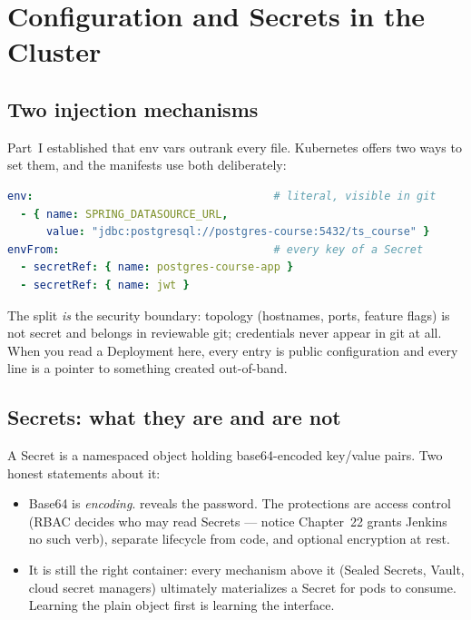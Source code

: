 \chapter{Configuration and Secrets in the Cluster}
\label{ch:secrets}

\section{Two injection mechanisms}

Part~I established that env vars outrank every file. Kubernetes offers
two ways to set them, and the manifests use both deliberately:

\begin{lstlisting}[language=yaml]
env:                                     # literal, visible in git
  - { name: SPRING_DATASOURCE_URL,
      value: "jdbc:postgresql://postgres-course:5432/ts_course" }
envFrom:                                 # every key of a Secret
  - secretRef: { name: postgres-course-app }
  - secretRef: { name: jwt }
\end{lstlisting}

The split \emph{is} the security boundary: topology (hostnames, ports,
feature flags) is not secret and belongs in reviewable git; credentials
never appear in git at all. When you read a Deployment here, every
 entry is public configuration and every  line
is a pointer to something created out-of-band.

\section{Secrets: what they are and are not}

A Secret is a namespaced object holding base64-encoded key/value pairs.
Two honest statements about it:

\begin{itemize}
  \item Base64 is \emph{encoding}. 
  reveals the password. The protections are access control (RBAC decides
  who may read Secrets --- notice Chapter~22 grants Jenkins no such
  verb), separate lifecycle from code, and optional encryption at rest.
  \item It is still the right container: every mechanism above it
  (Sealed Secrets, Vault, cloud secret managers) ultimately materializes
  a Secret for pods to consume. Learning the plain object first is
  learning the interface.
\end{itemize}

